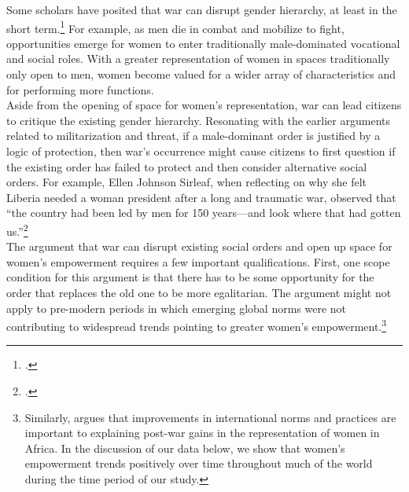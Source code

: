 \documentclass [12pt] {article}
\begin{document}
Some scholars have posited that war can disrupt gender hierarchy, at least in the short term.\footnote{.} For example, as men die in combat and mobilize to fight, opportunities emerge for women to enter traditionally male-dominated vocational and social roles. With a greater representation of women in spaces traditionally only open to men, women become valued for a wider array of characteristics and for performing more functions. \\

Aside from the opening of space for women's representation, war can lead citizens to critique the existing gender hierarchy. Resonating with the earlier arguments related to militarization and threat, if a male-dominant order is justified by a logic of protection, then war's occurrence might cause citizens to first question if the existing order has failed to protect and then consider alternative social orders. For example, Ellen Johnson Sirleaf, when reflecting on why she felt Liberia needed a woman president after a long and traumatic war, observed that ``the country had been led by men for 150 years---and look where that had gotten us.''\footnote{.} \\

The argument that war can disrupt existing social orders and open up space for women's empowerment requires a few important qualifications. First, one scope condition for this argument is that there has to be some opportunity for the order that replaces the old one to be more egalitarian. The argument might not apply to pre-modern periods in which emerging global norms were not contributing to widespread trends pointing to greater women's empowerment.\footnote{Similarly,  argues that improvements in international norms and practices are important to explaining post-war gains in the representation of women in Africa. In the discussion of our data below, we show that women's empowerment trends positively over time throughout much of the world during the time period of our study.} \\
\end{document}
